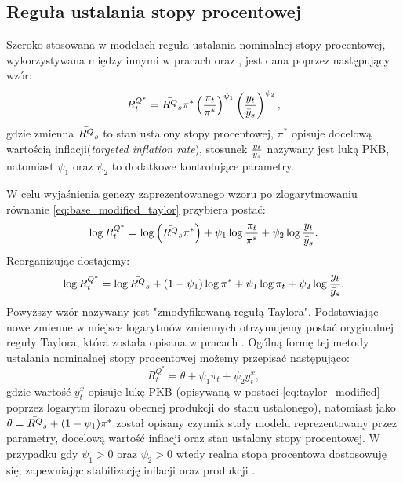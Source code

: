 \subsection{Reguła ustalania stopy procentowej}

Szeroko stosowana w modelach reguła ustalania nominalnej stopy procentowej, wykorzystywana między innymi w pracach \cite{costaBook} oraz \cite{herbst}, jest dana poprzez następujący wzór:
\begin{equation}
    \label{eq:base_modified_taylor}
     R^{Q^*}_t = \bar{R^Q}_s \pi^* \left( \frac{\pi_t}{\pi^*}\right)^{\psi_1} \left(\frac{y_t}{\bar{y}_s}\right)^{\psi_2},
\end{equation}
gdzie zmienna $\bar{R^Q}_s$ to stan ustalony stopy procentowej, $\pi^*$ opisuje docelową wartością inflacji(\emph{targeted inflation rate}), stosunek $\frac{y_t}{\bar{y}_s}$ nazywany jest luką PKB, natomiast $\psi_1$ oraz $\psi_2$ to dodatkowe kontrolujące parametry.

W celu wyjaśnienia genezy zaprezentowanego wzoru po zlogarytmowaniu równanie \eqref{eq:base_modified_taylor} przybiera postać:
\begin{equation}
    \log{R_t^{Q^*}} = \log{\left(\bar{R^Q}_s \pi^*\right)} + \psi_1\log{\frac{\pi_t}{\pi^*}} + \psi_2 \log{\frac{y_t}{\bar{y}_s}}.
\end{equation}  
Reorganizując dostajemy:
\begin{equation}
    \label{eq:taylor_modified}
    \log{R_t^{Q^*}} = \log{\bar{R^Q}_s} + \left(1 - \psi_1\right)\log{\pi^*} + \psi_1\log{\pi_t} + \psi_2 \log{\frac{y_t}{\bar{y}_s}}.
\end{equation}
Powyższy wzór nazywany jest "zmodyfikowaną regułą Taylora". Podstawiając nowe zmienne w miejsce logarytmów zmiennych otrzymujemy postać oryginalnej reguły Taylora, która została opisana w pracach \cite{taylor} \cite{gali_gov_spending}. Ogólną formę tej metody ustalania nominalnej stopy procentowej możemy przepisać następująco:
\begin{equation}
    \label{eq:taylor_gen}
    R^{Q^*}_t = \theta + \psi_1 \pi_t + \psi_2 y^x_t,
\end{equation}
gdzie wartość $y^x_t$ opisuje lukę PKB (opisywaną w postaci \eqref{eq:taylor_modified} poprzez logarytm ilorazu obecnej produkcji do stanu ustalonego), natomiast jako $\theta = \bar{R^Q}_s + (1-\psi_1)\pi^*$ został opisany czynnik stały modelu reprezentowany przez parametry, docelową wartość inflacji oraz stan ustalony stopy procentowej. W przypadku gdy $\psi_1 > 0$ oraz $\psi_2 > 0$ wtedy realna stopa procentowa dostosowuję się, zapewniając stabilizację inflacji oraz produkcji \cite{costaBook}.


